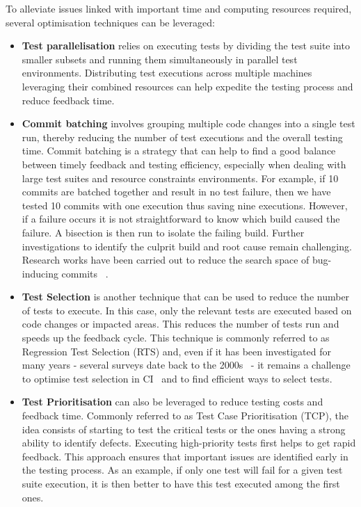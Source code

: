 To alleviate issues linked with important time and computing resources required, several optimisation techniques can be leveraged:

\begin{itemize}[label={}]
    \item \textbf{Test parallelisation} relies on executing tests by dividing the test suite into smaller subsets and running them simultaneously in parallel test environments. Distributing test executions across multiple machines leveraging their combined resources can help expedite the testing process and reduce feedback time.
    
    \item \textbf{Commit batching} involves grouping multiple code changes into a single test run, thereby reducing the number of test executions and the overall testing time. Commit batching is a strategy that can help to find a good balance between timely feedback and testing efficiency, especially when dealing with large test suites and resource constraints environments. For example, if 10 commits are batched together and result in no test failure, then we have tested 10 commits with one execution thus saving nine executions. However, if a failure occurs it is not straightforward to know which build caused the failure. A bisection is then run to isolate the failing build. Further investigations to identify the culprit build and root cause remain challenging. Research works have been carried out to reduce the search space of bug-inducing commits ~\cite{batching, najafi2019bisecting, an2021reducing}.
    
    \item \textbf{Test Selection} is another technique that can be used to reduce the number of tests to execute. In this case, only the relevant tests are executed based on code changes or impacted areas. This reduces the number of tests run and speeds up the feedback cycle. This technique is commonly referred to as Regression Test Selection (RTS) and, even if it has been investigated for many years - several surveys date back to the 2000s~\cite{engstrom2010systematic,rothermel1996analyzing,graves2001empirical} - it remains a challenge to optimise test selection in CI~\cite{shi2019understanding} and to find efficient ways to select tests. 

    \item \textbf{Test Prioritisation} can also be leveraged to reduce testing costs and feedback time. Commonly referred to as Test Case Prioritisation (TCP), the idea consists of starting to test the critical tests or the ones having a strong ability to identify defects. Executing high-priority tests first helps to get rapid feedback. This approach ensures that important issues are identified early in the testing process. As an example, if only one test will fail for a given test suite execution, it is then better to have this test executed among the first ones.

\end{itemize}

